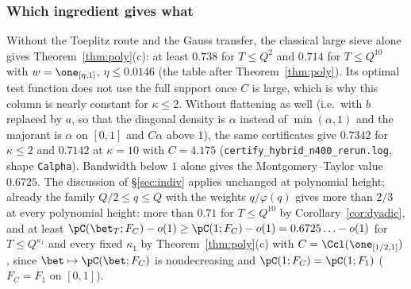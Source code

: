 \subsubsection*{Which ingredient gives what}
Without the Toeplitz route and the Gauss transfer, the classical large sieve alone gives Theorem~\ref{thm:poly}(c): at least $0.738$ for $T\le Q^2$ and $0.714$ for $T\le Q^{10}$ with $w=\one_{[\eta,1]}$, $\eta\le0.0146$ (the table after Theorem~\ref{thm:poly}). Its optimal test function does not use the full support once $C$ is large, which is why this column is nearly constant for $\kappa\le2$. Without flattening as well (i.e.\ with $b$ replaced by $a$, so that the diagonal density is $\alpha$ instead of $\min(\alpha,1)$ and the majorant is $\alpha$ on $[0,1]$ and $C\alpha$ above $1$), the same certificates give $0.7342$ for $\kappa\le2$ and $0.7142$ at $\kappa=10$ with $C=4.175$ (\texttt{certify\_hybrid\_n400\_rerun.log}, shape \texttt{Calpha}). Bandwidth below $1$ alone gives the Montgomery--Taylor value $0.6725$. The discussion of \S\ref{sec:indiv} applies unchanged at polynomial height; already the family $Q/2\le q\le Q$ with the weights $q/\varphi(q)$ gives more than $2/3$ at every polynomial height: more than $0.71$ for $T\le Q^{10}$ by Corollary~\ref{cor:dyadic}, and at least $\pC(\bet_T;F_C)-o(1)\ge\pC(1;F_C)-o(1)=0.6725\ldots-o(1)$ for $T\le Q^{\kappa_1}$ and every fixed $\kappa_1$ by Theorem~\ref{thm:poly}(c) with $C=\Ccl(\one_{[1/2,1]})$, since $\bet\mapsto\pC(\bet;F_C)$ is nondecreasing and $\pC(1;F_C)=\pC(1;F_1)$ ($F_C=F_1$ on $[0,1]$).
